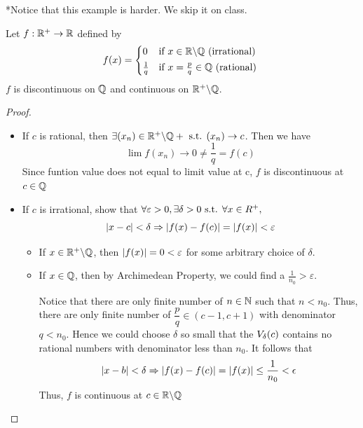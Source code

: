 \documentclass[a4paper,12pt]{article}
\begin{document}
\begin{example} *Notice that this example is harder. We skip it on class.

    Let \(f:\mathbb{R}^+\rightarrow \mathbb{R}\) defined by 
    \[f(x)=\begin{cases*}
        0 & if \(x\in \R\backslash\Q\) (irrational)\\
        \frac{1}{q} & if \(x=\frac{p}{q}\in\Q\) (rational)
    \end{cases*}\]
     \(f\) is discontinuous on \(\mathbb{Q}\) and continuous on \(\mathbb{R}^+\backslash\mathbb{Q}\).
    \begin{proof}\ 
        \begin{itemize}
            \item If \(c\) is rational, then \(\exists(x _{n })\in\mathbb{R}^+\backslash\mathbb{Q}+\text{ s.t. } (x _{n })\rightarrow c\). Then we have 
            \[\lim f(x_n)\rightarrow 0\neq \dfrac{1}{q}=f(c)\]
            Since funtion value does not equal to limit value at c, \(f\) is discontinuous at \(c\in\mathbb{Q}\)
            \item If \(c\) is irrational,
             show that \(\forall \varepsilon>0, \exists \delta>0\text{ s.t. } \forall x\in R^+,\)
            \[\left\lvert x-c\right\rvert<\delta\Rightarrow\left\lvert f(x)-f(c)\right\rvert=\left\lvert f(x)\right\rvert<\varepsilon\]
            \begin{itemize}
                \item If \(x\in \mathbb{R}^+\backslash\mathbb{Q}\), then \(\left\lvert f(x)\right\rvert=0<\varepsilon\) for some arbitrary choice of \(\delta\).
                \item If \(x\in \mathbb{Q}\), then by Archimedean Property, we could find a \(\frac{1}{n_0}>\varepsilon\). 
                
                Notice that there are only finite number of \(n\in\mathbb{N}\) such that \(n<n_0\). Thus, there are only 
                finite number of \(\dfrac{p}{q}\in(c-1,c+1)\) with denominator \(q<n_0\). Hence we could choose \(\delta\) so small that 
                the \(V_{\delta }{(c )}\) contains no rational numbers with denominator less than \(n_0\). It follows that 
                \[\left\lvert x-b\right\rvert<\delta \Rightarrow \left\lvert f(x)-f(c)\right\rvert=\left\lvert f(x)\right\rvert\le \dfrac{1}{n_0}<\epsilon\]
                Thus, \(f\) is continuous at \(c\in\mathbb{R}\backslash\mathbb{Q}\)
                
            \end{itemize}
        \end{itemize}
    \end{proof}
\end{example}
\end{document}
